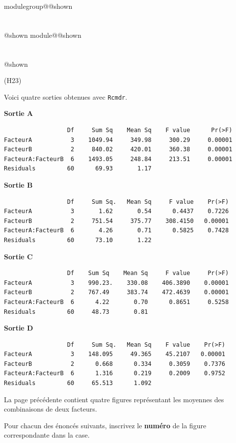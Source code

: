 \documentclass{Evaluation}
\makeatletter
\newcommand{\currentmodulekey}{}
\newcommand{\currentmoduletitle}{}
\newcommand{\currentgroupkey}{}
\newcommand{\currentgrouptitle}{}
\newcommand{\showmoduleifneeded}{%
  \ifx\currentgroupkey\empty\else
    \expandafter\ifx\csname modulegroup@\currentgroupkey @shown\endcsname\relax
      \section*{\currentgrouptitle}%
      \expandafter\gdef\csname modulegroup@\currentgroupkey @shown\endcsname{1}%
    \fi
  \fi
  \expandafter\ifx\csname module@\currentmodulekey @shown\endcsname\relax
    \section*{\currentmoduletitle}%
    \expandafter\gdef\csname module@\currentmodulekey @shown\endcsname{1}%
  \fi
}
\newenvironment{H23}{\showmoduleifneeded}{}
\makeatother
\begin{document}
\begin{questions}
\begin{H23}
\question\label{QCMANOVA}
(H23)

Voici quatre sorties obtenues avec \texttt{Rcmdr}.

\smallskip
{\bf Sortie A}
\begin{verbatim}
                  Df     Sum Sq    Mean Sq    F value      Pr(>F)    
FacteurA           3    1049.94     349.98     300.29     0.00001 
FacteurB           2     840.02     420.01     360.38     0.00001 
FacteurA:FacteurB  6    1493.05     248.84     213.51     0.00001 
Residuals         60      69.93       1.17                           
\end{verbatim}

{\bf Sortie B}
\begin{verbatim}
                  Df     Sum Sq.   Mean Sq     F value    Pr(>F)    
FacteurA           3       1.62       0.54      0.4437    0.7226    
FacteurB           2     751.54     375.77    308.4150   0.00001
FacteurA:FacteurB  6       4.26       0.71      0.5825    0.7428    
Residuals         60      73.10       1.22                         
\end{verbatim}

{\bf Sortie C}
\begin{verbatim}
                  Df    Sum Sq    Mean Sq     F value     Pr(>F)    
FacteurA           3    990.23.    330.08    406.3890    0.00001
FacteurB           2    767.49     383.74    472.4639    0.00001
FacteurA:FacteurB  6      4.22       0.70      0.8651     0.5258    
Residuals         60     48.73       0.81               
\end{verbatim}

{\bf Sortie D}
\begin{verbatim}
                  Df     Sum Sq.   Mean Sq    F value    Pr(>F)    
FacteurA           3    148.095     49.365    45.2107   0.00001
FacteurB           2      0.668      0.334     0.3059    0.7376    
FacteurA:FacteurB  6      1.316      0.219     0.2009    0.9752    
Residuals         60     65.513      1.092                        
\end{verbatim}
La page précédente contient quatre figures représentant les moyennes des combinaisons de deux facteurs.

Pour chacun des énoncés suivants, inscrivez le \textbf{numéro} de la figure correspondante dans la case.
\end{H23}
\end{questions}
\end{document}
